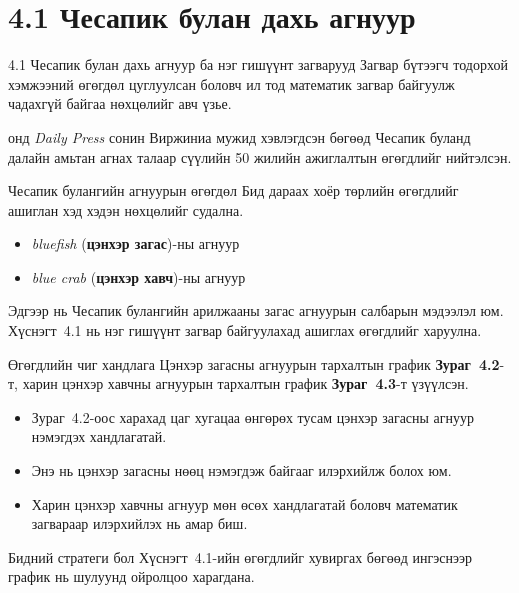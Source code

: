 \documentclass[dvipsnames]{beamer}
\begin{document}
\section{4.1 Чесапик булан дахь агнуур}

\begin{frame}{4.1 Чесапик булан дахь агнуур ба нэг гишүүнт загварууд}
\small
Загвар бүтээгч тодорхой хэмжээний өгөгдөл цуглуулсан боловч ил тод
математик загвар байгуулж чадахгүй байгаа нөхцөлийг авч үзье.

 онд \emph{Daily Press} сонин Виржиниа мужид хэвлэгдсэн бөгөөд
Чесапик буланд далайн амьтан агнах талаар сүүлийн 50 жилийн
ажиглалтын өгөгдлийг нийтэлсэн.
\end{frame}

\begin{frame}{Чесапик булангийн агнуурын өгөгдөл}
\small
Бид дараах хоёр төрлийн өгөгдлийг ашиглан хэд хэдэн нөхцөлийг судална.

\begin{itemize}
\item \emph{bluefish} (\textbf{цэнхэр загас})-ны агнуур
\item \emph{blue crab} (\textbf{цэнхэр хавч})-ны агнуур
\end{itemize}

Эдгээр нь Чесапик булангийн арилжааны загас агнуурын салбарын мэдээлэл
юм. Хүснэгт~4.1 нь нэг гишүүнт загвар байгуулахад ашиглах өгөгдлийг
харуулна.
\end{frame}

\begin{frame}{Өгөгдлийн чиг хандлага}
\small
Цэнхэр загасны агнуурын тархалтын график \textbf{Зураг~4.2}-т, харин
цэнхэр хавчны агнуурын тархалтын график \textbf{Зураг~4.3}-т үзүүлсэн.

\begin{itemize}
\item Зураг~4.2-оос харахад цаг хугацаа өнгөрөх тусам цэнхэр загасны агнуур
      нэмэгдэх хандлагатай.
\item Энэ нь цэнхэр загасны нөөц нэмэгдэж байгааг илэрхийлж болох юм.
\item Харин цэнхэр хавчны агнуур мөн өсөх хандлагатай боловч математик
      загвараар илэрхийлэх нь амар биш.
\end{itemize}

Бидний стратеги бол Хүснэгт~4.1-ийн өгөгдлийг хувиргах бөгөөд ингэснээр
график нь шулуунд ойролцоо харагдана.
\end{frame}
\end{document}
